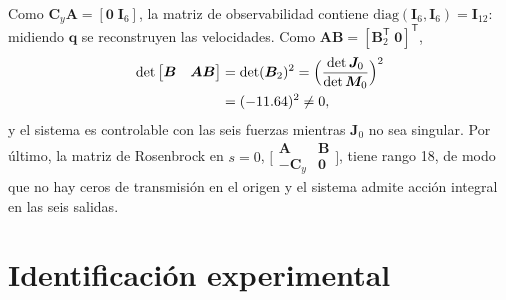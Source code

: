 \documentclass[conference]{IEEEtran}
\newcommand{\vect}[1]{\bm{#1}}
\newcommand{\T}{^{\mathsf{T}}}
\begin{document}
Como $\vect C_y\vect A = [\vect 0\;\vect I_6]$, la matriz de observabilidad contiene $\mathrm{diag}(\vect I_6, \vect I_6) = \vect I_{12}$: midiendo $\vect q$ se reconstruyen las velocidades. Como $\vect A\vect B = [\vect B_2\T\;\vect 0]\T$,
\begin{equation}
\begin{split}
\det\begin{bmatrix}\vect B & \vect A\vect B\end{bmatrix} &= \det(\vect B_2)^2 = \Bigl(\frac{\det\vect J_0}{\det\vect M_0}\Bigr)^2\\ &= (-11.64)^2 \ne 0,
\end{split}
\end{equation}
y el sistema es controlable con las seis fuerzas mientras $\vect J_0$ no sea singular. Por último, la matriz de Rosenbrock en $s = 0$, $\bigl[\begin{smallmatrix}\vect A & \vect B\\ -\vect C_y & \vect 0\end{smallmatrix}\bigr]$, tiene rango 18, de modo que no hay ceros de transmisión en el origen y el sistema admite acción integral en las seis salidas.

\section{Identificación experimental}\label{sec:ident}
\end{document}
